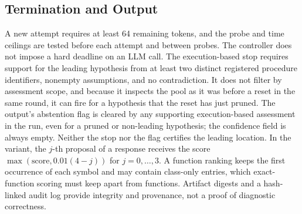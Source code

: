 \documentclass[letterpaper,journal]{IEEEtran}
\newcommand{\code}[1]{\texttt{\detokenize{#1}}}
\begin{document}
\subsection{Termination and Output}\label{app:termination}
A new attempt requires at least 64 remaining tokens, and the probe and time ceilings are tested before each attempt and between probes. The controller does not impose a hard deadline on an LLM call. The execution-based stop requires support for the leading hypothesis from at least two distinct registered procedure identifiers, nonempty assumptions, and no contradiction. It does not filter by assessment scope, and because it inspects the pool as it was before a reset in the same round, it can fire for a hypothesis that the reset has just pruned. The output's abstention flag is cleared by any supporting execution-based assessment in the run, even for a pruned or non-leading hypothesis; the confidence field is always empty. Neither the stop nor the flag certifies the leading location. In the \code{no_probes} variant, the $j$-th proposal of a response receives the score $\max(\mathrm{score},0.01(4-j))$ for $j=0,\ldots,3$. A function ranking keeps the first occurrence of each symbol and may contain class-only entries, which exact-function scoring must keep apart from functions. Artifact digests and a hash-linked audit log provide integrity and provenance, not a proof of diagnostic correctness.
\end{document}
